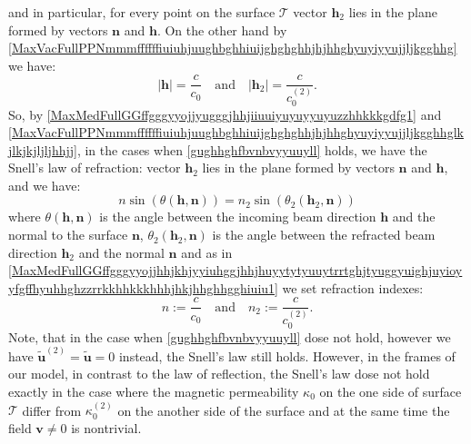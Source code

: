 \documentclass{article}
\theoremstyle{definition}
\theoremstyle{remark}
\renewcommand{\vec}[1]{\mathbf{#1}}
\newcommand{\er}{\eqref}
\newcommand{\er}{\eqref}
\begin{document}
and in particular, for every point on the surface $\mathcal{T}$
vector $\vec h_2$ lies in the plane formed by vectors $\vec n$ and
$\vec h$. On the other hand by
\er{MaxVacFullPPNmmmffffffiuiuhjuughbghhiuijghghghhjhjhhghyuyiyyujjljkgghhg}
we have:
\begin{equation}\label{MaxVacFullPPNmmmffffffiuiuhjuughbghhiuijghghghhjhjhhghyuyiyyujjljkgghhglkjlkjkjljljhhjj}
|\vec h|=\frac{c}{c_0}\quad\text{and}\quad|\vec
h_2|=\frac{c}{c^{(2)}_0}.
\end{equation}
So, by
\er{MaxMedFullGGffgggyyojjyugggjhhjiiuuiyuyuyyuyuzzhhkkkgdfg1} and
\er{MaxVacFullPPNmmmffffffiuiuhjuughbghhiuijghghghhjhjhhghyuyiyyujjljkgghhglkjlkjkjljljhhjj},
in the cases when \er{gughhghfbvnbvyyuuyll} holds, we have the
Snell's law of refraction: vector $\vec h_2$ lies in the plane
formed by vectors $\vec n$ and $\vec h$, and we have:
\begin{equation}\label{MaxMedFulljhhjjjjjhhhj}
n\sin{\left(\theta\left(\vec h,\vec
n\right)\right)}=n_2\sin{\left(\theta_2\left(\vec h_2,\vec
n\right)\right)}
\end{equation}
where $\theta\left(\vec h,\vec n\right)$ is the angle between the
incoming beam direction $\vec h$ and the normal to the surface $\vec
n$, $\theta_2\left(\vec h_2,\vec n\right)$ is the angle between the
refracted beam direction $\vec h_2$ and the normal $\vec n$ and as
in
\er{MaxMedFullGGffgggyyojjhhjkhjyyiuhggjhhjhuyytytyuuytrrtghjtyuggyuighjuyioyyfgffhyuhhghzzrrkkhhkkkhhhjhkjhhghhgghiuiu1}
we set refraction indexes:
\begin{equation}\label{MaxMedFullGGffgggyyojjhhjkhjyyiuhggjhhjhuyytytyuuytrrtghjtyuggyuighjuyioyyfgffhyuhhghzzrrkkhhkkkhhhjhkjhhghhgghiuiujjkjk}
n:=\frac{c}{c_0}\quad\text{and}\quad n_2:=\frac{c}{c^{(2)}_0}.
\end{equation}
Note, that in the case when \er{gughhghfbvnbvyyuuyll} dose not hold,
however we have $\vec {\tilde u}^{(2)}=\vec {\tilde u}=0$ instead,
the Snell's law still holds. However, in the frames of our model, in
contrast to the law of reflection, the Snell's law dose not hold
exactly in the case where the magnetic permeability $\kappa_0$ on
the one side of surface $\mathcal{T}$ differ from $\kappa^{(2)}_0$
on the another side of the surface and at the same time the field
$\vec v\neq 0$ is nontrivial.
\end{document}
